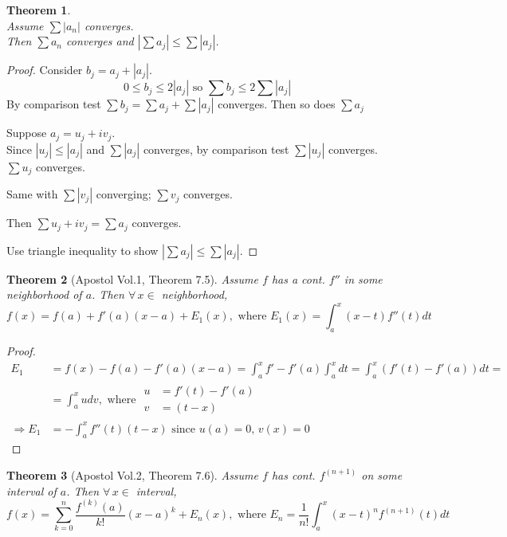 \documentclass[twoside]{amsart}
\theoremstyle{plain}
\newtheorem{theorem}{Theorem}
\theoremstyle{definition}
\begin{document}
\begin{theorem} \quad \\
  Assume $\sum |a_n|$ converges.  \medskip \\
  \quad Then $\sum a_n$ converges and $|\sum a_j | \leq \sum |a_j |$.  
\end{theorem}

\begin{proof}
  Consider $b_j = a_j + |a_j|$.  
\[
0 \leq b_j \leq 2 |a_j| \text{ so } \sum b_j \leq 2 \sum |a_j|
\]
By comparison test $\sum b_j = \sum a_j + \sum |a_j|$ converges.  Then so does $\sum a_j$

Suppose $a_j = u_j + iv_j$.  \medskip \\
Since $|u_j| \leq |a_j|$ and $\sum |a_j| $ converges, by comparison test $\sum |u_j|$ converges.  \\
\phantom{ Since } $\sum u_j$ converges.  

Same with $\sum |v_j|$ converging; $\sum v_j$ converges.  

Then $\sum u_j + iv_j = \sum a_j$ converges.  

Use triangle inequality to show $|\sum a_j| \leq \sum |a_j|$.  

\end{proof}

\begin{theorem}[Apostol Vol.1, Theorem 7.5] Assume $f$ has a cont. $f''$ in some neighborhood of $a$.  Then $\forall \, x \in$ neighborhood,
\[
f(x) = f(a) + f'(a)(x-a) + E_1(x), \text{ where } E_1(x) = \int_a^x (x-t) f''(t) dt 
\]
\end{theorem}
\begin{proof} 
\[
\begin{aligned}
  E_1 & = f(x) -f(a) - f'(a)(x-a) = \int_a^x f' - f'(a) \int_a^x dt = \int_a^x (f'(t) -f'(a)) dt = \\
  & = \int_a^x u dv, \text{ where } \begin{aligned} u & = f'(t) -f'(a) \\ v & = (t-x) \end{aligned} \\
  \Longrightarrow E_1 & = -\int_a^x f''(t)(t-x) \text{ since } u(a) = 0, \, v(x) =0
\end{aligned}
\]
\end{proof}

\begin{theorem}[Apostol Vol.2, Theorem 7.6] Assume $f$ has cont. $f^{(n+1)}$ on some interval of $a$.  Then $\forall \, x \in $ interval, 
\[
f(x) = \sum_{k=0}^n \frac{ f^{(k)}(a) }{k!} (x-a)^k + E_n(x), \text{ where } E_n = \frac{1}{n!} \int_a^x (x-t)^n f^{(n+1)}(t) dt 
\]
\end{theorem}
\end{document}
